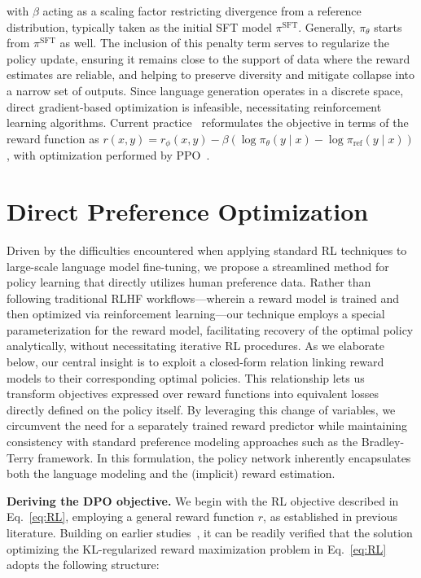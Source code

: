 with $\beta$ acting as a scaling factor restricting divergence from a reference distribution, typically taken as the initial SFT model $\pi^\text{SFT}$. Generally, $\pi_{\theta}$ starts from $\pi^\text{SFT}$ as well. The inclusion of this penalty term serves to regularize the policy update, ensuring it remains close to the support of data where the reward estimates are reliable, and helping to preserve diversity and mitigate collapse into a narrow set of outputs. Since language generation operates in a discrete space, direct gradient-based optimization is infeasible, necessitating reinforcement learning algorithms. Current practice~\citep{ziegler2020finetuning, stiennon2022learning, bai2022training, ouyang2022training} reformulates the objective in terms of the reward function as $r(x, y) = r_{\phi}(x, y) -\beta (\log \pi_{\theta}(y\mid x) - \log \pi_\text{ref}(y\mid x))$, with optimization performed by PPO~\cite{schulman2017proximal}.

\section{Direct Preference Optimization}\label{sec:DPO}

Driven by the difficulties encountered when applying standard RL techniques to large-scale language model fine-tuning, we propose a streamlined method for policy learning that directly utilizes human preference data. Rather than following traditional RLHF workflows—wherein a reward model is trained and then optimized via reinforcement learning—our technique employs a special parameterization for the reward model, facilitating recovery of the optimal policy analytically, without necessitating iterative RL procedures. As we elaborate below, our central insight is to exploit a closed-form relation linking reward models to their corresponding optimal policies. This relationship lets us transform objectives expressed over reward functions into equivalent losses directly defined on the policy itself. By leveraging this change of variables, we circumvent the need for a separately trained reward predictor while maintaining consistency with standard preference modeling approaches such as the Bradley-Terry framework. In this formulation, the policy network inherently encapsulates both the language modeling and the (implicit) reward estimation.

\textbf{Deriving the DPO objective.} We begin with the RL objective described in Eq.~\ref{eq:RL}, employing a general reward function $r$, as established in previous literature. Building on earlier studies~\citep{peters2007reinforcement, peng2019advantage, korbak2022reinforcement, go2023aligning}, it can be readily verified that the solution optimizing the KL-regularized reward maximization problem in Eq.~\ref{eq:RL} adopts the following structure:

